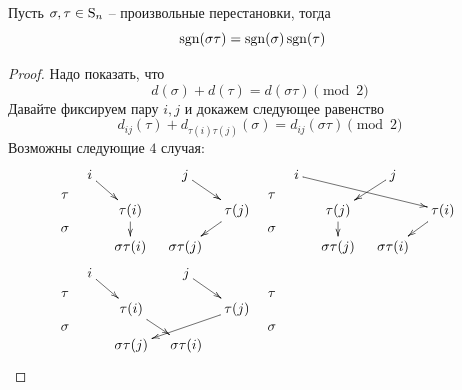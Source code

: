 \begin{claim*}
Пусть $\sigma,\tau\in\operatorname{S}_{n}$ -- произвольные перестановки, тогда 
\[
\operatorname{sgn}(\sigma\tau) = \operatorname{sgn}(\sigma)\operatorname{sgn}(\tau)\quad
\]
\end{claim*}
\begin{proof}
Надо показать, что
\[
d(\sigma) + d(\tau) = d(\sigma \tau) \pmod 2
\]
Давайте фиксируем пару $i, j$ и докажем следующее равенство
\[
d_{ij}(\tau) + d_{\tau(i)\tau(j)}(\sigma) = d_{ij}(\sigma \tau) \pmod 2
\]
Возможны следующие $4$ случая:
\begin{align*}
&{
\begin{matrix}
{\tau}\\{}\\{\sigma}
\end{matrix}\quad
\begin{aligned}
\xymatrix@R=10pt@C=10pt{
	{i}\ar[dr]&{}&{j}\ar[dr]&{}\\
	{}&{\tau(i)}\ar[d]&{}&{\tau(j)}\ar[dl]\\
	{}&{\sigma\tau(i)}&{\sigma\tau(j)}&{}\\
}
\end{aligned}
}&&{
\begin{matrix}
{\tau}\\{}\\{\sigma}
\end{matrix}\quad
\begin{aligned}
\xymatrix@R=10pt@C=10pt{
	{i}\ar[drrr]&{}&{j}\ar[dl]&{}\\
	{}&{\tau(j)}\ar[d]&{}&{\tau(i)}\ar[dl]\\
	{}&{\sigma\tau(j)}&{\sigma\tau(i)}&{}\\
}
\end{aligned}
}\\
&{
\begin{matrix}
{\tau}\\{}\\{\sigma}
\end{matrix}\quad
\begin{aligned}
\xymatrix@R=10pt@C=10pt{
	{i}\ar[dr]&{}&{j}\ar[dr]&{}\\
	{}&{\tau(i)}\ar[dr]&{}&{\tau(j)}\ar[dll]\\
	{}&{\sigma\tau(j)}&{\sigma\tau(i)}&{}\\
}
\end{aligned}
}&&{
\begin{matrix}
{\tau}\\{}\\{\sigma}
\end{matrix}\quad
}
\end{align*}
\end{proof}
